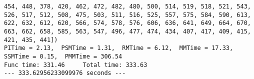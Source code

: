 \documentclass[11pt]{article}
\begin{document}
\begin{Verbatim}[commandchars=\\\{\}]
454, 448, 378, 420, 462, 472, 482, 480, 500, 514, 519, 518, 521, 543, 526, 517, 512, 508, 475, 503, 511, 516, 525, 557, 575, 584, 590, 613, 622, 632, 612, 620, 566, 574, 578, 576, 606, 636, 641, 649, 664, 670, 663, 662, 658, 585, 563, 547, 496, 477, 474, 434, 407, 417, 409, 415, 421, 435, 441])
PITime = 2.13,  PSMTime = 1.31,  RMTime = 6.12,  MMTime = 17.33,  SSMTime = 0.15,  PMMTime = 306.54
Func time: 331.46     Total time: 333.63
--- 333.62956233099976 seconds ---

    \end{Verbatim}


    
    
    
    
\end{document}
